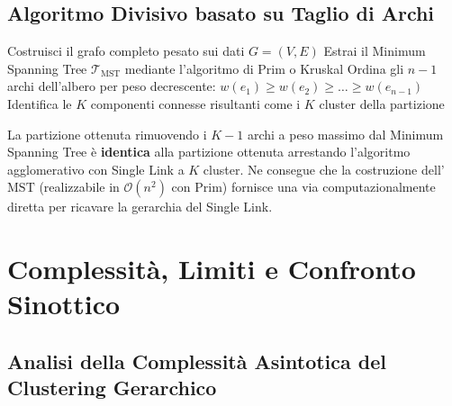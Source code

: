\subsection{Algoritmo Divisivo basato su Taglio di Archi}

\begin{algorithm}[htbp]
\SetAlgoLined
{}
Costruisci il grafo completo pesato sui dati $G = (V, E)$\;
Estrai il Minimum Spanning Tree $\mathcal{T}_{\mathrm{MST}}$ mediante l'algoritmo di Prim o Kruskal\;
Ordina gli $n - 1$ archi dell'albero per peso decrescente: $w(e_1) \ge w(e_2) \ge \dots \ge w(e_{n-1})$\;
Identifica le $K$ componenti connesse risultanti come i $K$ cluster della partizione\;
\caption{Clustering divisivo basato su Minimum Spanning Tree.}
\label{alg:dm-divisive-mst}
\end{algorithm}

\begin{property}
La partizione ottenuta rimuovendo i $K - 1$ archi a peso massimo dal Minimum Spanning Tree è \textbf{identica} alla partizione ottenuta arrestando l'algoritmo agglomerativo con Single Link a $K$ cluster. Ne consegue che la costruzione dell'$\mathrm{MST}$ (realizzabile in $\mathcal{O}(n^2)$ con Prim) fornisce una via computazionalmente diretta per ricavare la gerarchia del Single Link.
\end{property}

\section{Complessità, Limiti e Confronto Sinottico}
\label{sec:dm-hierarchical-complexity-comparison}

\subsection{Analisi della Complessità Asintotica del Clustering Gerarchico}

